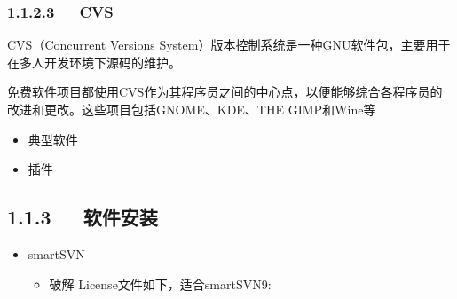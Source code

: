 \documentclass[letterpaper,12pt,english]{sphinxmanual}
\begin{document}
\subsubsection{1.1.2.3   CVS}
\label{\detokenize{001software/001install/_u7248_u672c_u63a7_u5236_u8f6f_u4ef6:cvs}}
\begin{DUlineblock}{0em}
\item[] CVS（Concurrent Versions System）版本控制系统是一种GNU软件包，主要用于在多人开发环境下源码的维护。
\item[] 免费软件项目都使用CVS作为其程序员之间的中心点，以便能够综合各程序员的改进和更改。这些项目包括GNOME、KDE、THE GIMP和Wine等
\end{DUlineblock}
\begin{itemize}
\item {} 
典型软件

\item {} 
插件

\end{itemize}


\subsection{1.1.3   软件安装}
\label{\detokenize{001software/001install/_u7248_u672c_u63a7_u5236_u8f6f_u4ef6:id6}}\begin{itemize}
\item {} 
smartSVN
\begin{itemize}
\item {} 
破解
License文件如下，适合smartSVN9:

\end{itemize}

\end{itemize}
\end{document}
